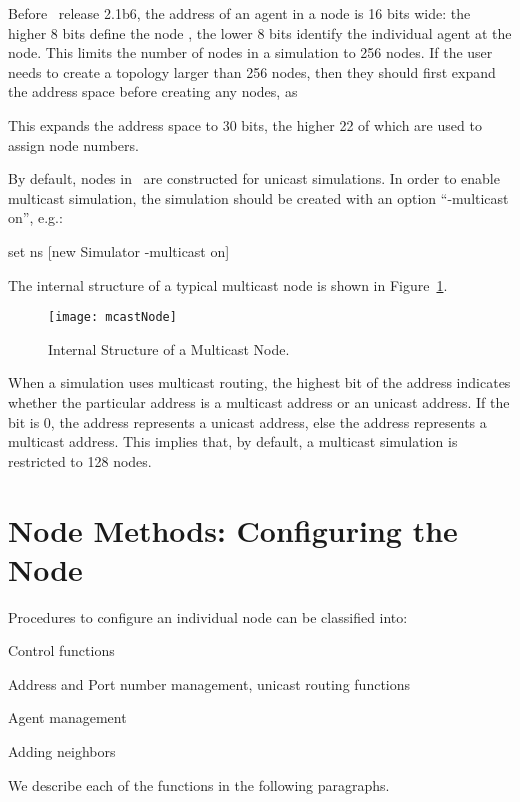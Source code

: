 Before \ns\ release 2.1b6, the address of an agent in a node is 16
bits wide: the higher 8 bits define the node ,
the lower 8 bits identify the individual agent at the node.
This limits the number of nodes in a simulation to 256 nodes.
If the user needs to create a topology larger than 256 nodes,
then they should first expand the address space before creating any
nodes, as
This expands the address space to 30 bits, the higher 22 of which are 
used to assign node numbers.


By default, nodes in \ns\ are constructed for unicast simulations.
In order to enable multicast simulation, the simulation should be created 
with an option ``-multicast on'', e.g.:
\begin{program}
        set ns [new Simulator -multicast on]
\end{program}
The internal structure of a typical multicast node is shown in
Figure~\ref{fig:node:multicast}.
\begin{figure}
  \centerline{\texttt{[image: mcastNode]}}
  \caption{Internal Structure of a Multicast Node.}
  \label{fig:node:multicast}
\end{figure}

When a simulation uses multicast routing,
the highest bit of the address indicates whether the particular
address is a multicast address or an unicast address.
If the bit is 0, the address represents a unicast address,
else the address represents a multicast address.
This implies that, by default, 
a multicast simulation is restricted to 128 nodes.

\section{Node Methods: Configuring the Node}
\label{sec:node:node}

Procedures to configure an individual node can be classified into:
\begin{list}{---}{\itemsep0pt}
\item Control functions
\item Address and Port number management, unicast routing functions
\item Agent management
\item Adding neighbors
\end{list}
We describe each of the functions in the following paragraphs.

